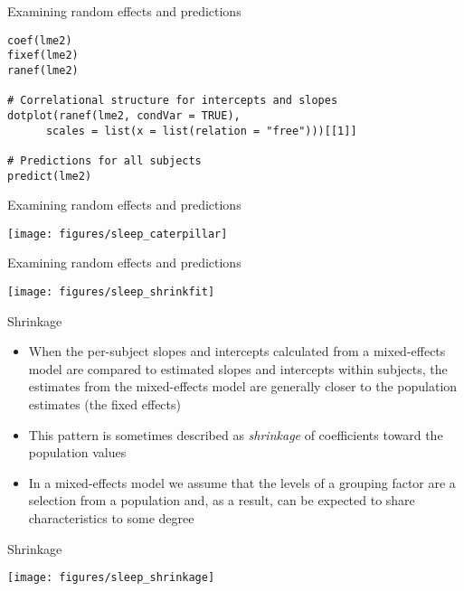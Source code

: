 \documentclass[aspectratio=169]{beamer}
\begin{document}
{

\begin{frame}[fragile]{Examining random effects and predictions}
      \begin{lstlisting}
coef(lme2)
fixef(lme2)
ranef(lme2)

# Correlational structure for intercepts and slopes
dotplot(ranef(lme2, condVar = TRUE),
      scales = list(x = list(relation = "free")))[[1]]

# Predictions for all subjects
predict(lme2)
      \end{lstlisting}
\end{frame}

}

\begin{frame}[fragile]{Examining random effects and predictions}
  \begin{center}
    \texttt{[image: figures/sleep\_caterpillar]}
  \end{center}
\end{frame}

\begin{frame}{Examining random effects and predictions}
  \begin{center}
    \texttt{[image: figures/sleep\_shrinkfit]}
  \end{center}
\end{frame}

\begin{frame}{Shrinkage}
  \begin{itemize}
    \item When the per-subject slopes and intercepts calculated from a
      mixed-effects model are compared to estimated slopes and intercepts
      within subjects, the estimates from the mixed-effects model are
      generally closer to the population estimates (the fixed effects)
    \item This pattern is sometimes described as {\it shrinkage} of
      coefficients toward the population values
    \item In a mixed-effects model we assume that the levels of a grouping
      factor are a selection from a population and, as a result, can be
      expected to share characteristics to some degree
  \end{itemize}
\end{frame}

\begin{frame}{Shrinkage}
  \begin{center}
    \texttt{[image: figures/sleep\_shrinkage]}
  \end{center}
\end{frame}
\end{document}
